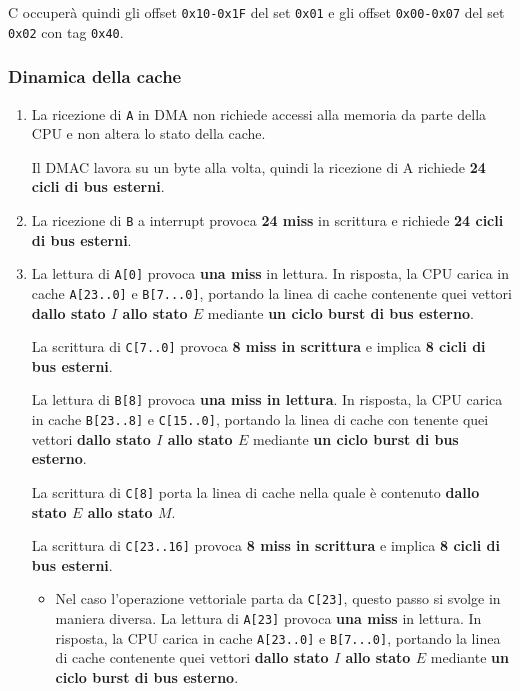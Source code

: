 \documentclass[a4paper]{article}
\begin{document}
C occuperà quindi gli offset \texttt{0x10-0x1F} del set \texttt{0x01} e gli offset \texttt{0x00-0x07} del set \texttt{0x02} con tag \texttt{0x40}.

\subsubsection{Dinamica della cache}
\begin{enumerate}
\item La ricezione di \texttt{A} in DMA non richiede accessi alla memoria da parte della CPU e non altera lo stato della cache.

Il DMAC lavora su un byte alla volta, quindi la ricezione di A richiede \textbf{24 cicli di bus esterni}.

\item La ricezione di \texttt{B} a interrupt provoca \textbf{24 miss} in scrittura e richiede \textbf{24 cicli di bus esterni}.

\item La lettura di \texttt{A[0]} provoca \textbf{una miss} in lettura. 
In risposta, la CPU carica in cache \texttt{A[23..0]} e \texttt{B[7...0]}, portando la linea di cache contenente quei vettori \textbf{dallo stato $I$ allo stato $E$} mediante \textbf{un ciclo burst di bus esterno}.

La scrittura di \texttt{C[7..0]} provoca \textbf{8 miss in scrittura} e implica \textbf{8 cicli di bus esterni}.

La lettura di \texttt{B[8]} provoca \textbf{una miss in lettura}.
In risposta, la CPU carica in cache \texttt{B[23..8]} e \texttt{C[15..0]}, portando la linea di cache con
tenente quei vettori \textbf{dallo stato $I$ allo stato $E$} mediante \textbf{un ciclo burst di bus esterno}.

La scrittura di \texttt{C[8]} porta la linea di cache nella quale è contenuto \textbf{dallo stato $E$ allo stato $M$}.

La scrittura di \texttt{C[23..16]} provoca \textbf{8 miss in scrittura} e implica \textbf{8 cicli di bus esterni}.

\begin{itemize}
\item Nel caso l'operazione vettoriale parta da \texttt{C[23]}, questo passo si svolge in maniera diversa.
 La lettura di \texttt{A[23]} provoca \textbf{una miss} in lettura.
In risposta, la CPU carica in cache \texttt{A[23..0]} e \texttt{B[7...0]}, portando la linea di cache contenente quei vettori \textbf{dallo stato $I$ allo stato $E$} mediante \textbf{un ciclo burst di bus esterno}.


\end{itemize}
\end{enumerate}
\end{document}
